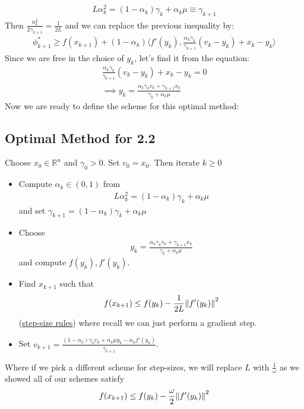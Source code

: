 \documentclass[12pt,a4paper]{article}
\begin{document}
	 \begin{align*}
	 	L \alpha_k^2 = (1 - \alpha_k)\gamma_k + \alpha_k \mu \equiv \gamma_{k+1}
	 \end{align*}
	 Then $\frac{\alpha_k^2}{2 \gamma_{k+1}} = \frac{1}{2L}$ and we can replace the previous inequality by:
	 \begin{align*}
	 	\phi_{k+1}^* \geq f(x_{k+1}) + (1 - \alpha_k) \langle f'(y_k), \frac{\alpha_k\gamma_k}{\gamma_{k+1}}(v_k - y_k) + x_k - y_k \rangle
	 \end{align*}
	 Since we are free in the choice of $y_k$, let's find it from the equation:
	 \begin{align*}
	 	\frac{\alpha_k\gamma_k}{\gamma_{k+1}}(v_k - y_k) + x_k - y_k = 0 \\
	 	 \implies y_k = \frac{\alpha_k\gamma_kv_k + \gamma_{k+1}x_k}{\gamma_k + \alpha_k \mu}
	 \end{align*}
	 Now we are ready to define the scheme for this optimal method:
	 
	 
	 \subsection*{Optimal Method for 2.2}\label{sec22opt}
	 Choose $x_0 \in \mathbb{R}^n$ and $\gamma_0 > 0$. Set $v_0 = x_0$. Then iterate $k \geq 0$
	 \begin{itemize}
	 	\item Compute $\alpha_k \in (0,1)$ from 
	 	\begin{align*}
	 		L \alpha_k^2 = (1 - \alpha_k)\gamma_k + \alpha_k\mu
	 	\end{align*}
	 	and set $\gamma_{k+1} = (1 - \alpha_k)\gamma_k + \alpha_k \mu$
	 	\item Choose
	 	\begin{align*}
	 		y_k = \frac{\alpha_k\gamma_kv_k + \gamma_{k+1}x_k}{\gamma_k + \alpha_k\mu}
	 	\end{align*}
	 	and compute $f(y_k), f'(y_k)$.
	 	\item Find $x_{k+1}$ such that
	 	\begin{align*}
	 		f(x_{k+1}) \leq f(y_k) - \frac{1}{2L} \norm{f'(y_k)}^2
	 	\end{align*}
	 	(\hyperref[sec123]{step-size rules}) where recall we can just perform a gradient step.
	 	\item Set $v_{k+1} = \frac{(1 - \alpha_k)\gamma_kv_k + \alpha_k\mu y_k - \alpha_kf'(y_k)}{\gamma_{k+1}}$.
	 \end{itemize}
	 Where if we pick a different scheme for step-sizes, we will replace $L$ with $\frac{1}{\omega}$ as we showed all of our schemes satisfy
	 \begin{align*}
	 	f(x_{k+1}) \leq f(y_k) - \frac{\omega}{2}\norm{f'(y_k)}^2
	 \end{align*}
	 
\end{document}
